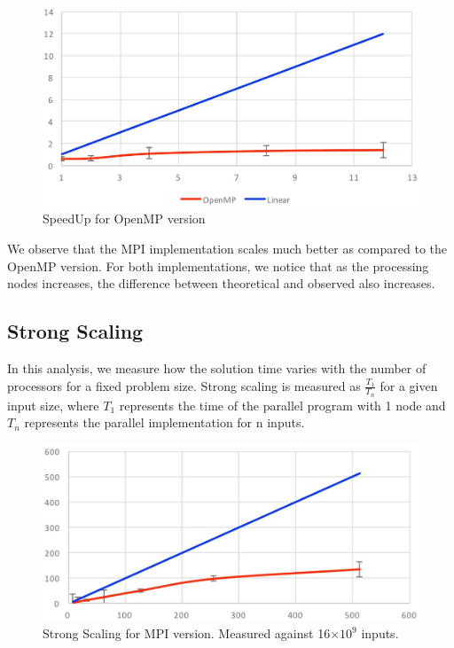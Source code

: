 \documentclass[11pt]{article}
\begin{document}
\begin{figure}[h!]
    \centering
        \includegraphics[scale=0.21]{SpeedUp_OpenMP.jpg}
        \caption{SpeedUp for OpenMP version}
        \label{SpeedUp_OpenMP}
    \centering
\end{figure}

We observe that the MPI implementation scales much better as compared to the OpenMP version. For both implementations, we notice that as the processing nodes increases, the difference between theoretical and observed also increases. 

\subsection{Strong Scaling}

In this analysis, we measure how the solution time varies with the number of processors for a fixed problem size. Strong scaling is measured as $\frac{T_{1}}{T_{n}}$ for a given input size, where $T_{1}$ represents the time of the parallel program with 1 node and $T_{n}$ represents the parallel implementation for n inputs.

\begin{figure}[h!]
    \centering
        \includegraphics[scale=0.22]{Strong_MPI.jpg}
        \caption{Strong Scaling for MPI version. Measured against 16$\times10^{9}$ inputs.}
        \label{Strong_MPI}
    \centering
\end{figure}
\end{document}
